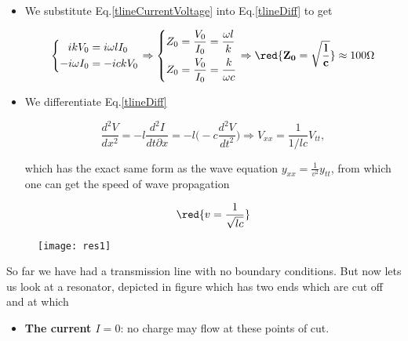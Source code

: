  \begin{itemize}
 \item     We     substitute    Eq.\eqref{tlineCurrentVoltage}     into
   Eq.\eqref{tlineDiff} to get

  \begin{equation}
    \left\lbrace \begin{aligned}
        ikV_0&=i\omega lI_0\\
        -i\omega I_0 & = -ickV_0
      \end{aligned}\right. \Rightarrow\left\lbrace \begin{aligned}
        Z_0&=\frac{V_0}{I_0} = \frac{\omega l }{k}\\
        Z_0&=\frac{V_0}{I_0} = \frac{k}{\omega c}\\
      \end{aligned}\right.  \Rightarrow \red{\mathbf{Z_0 = \sqrt{\frac{l}{c}}}}\approx
    100\Omega
  \end{equation}

\item We differentiate Eq.\eqref{tlineDiff}

  \begin{equation}
    \frac{d^2V}{dx^2} = -l\frac{d^2I}{dt\partial x} = -l\bigg(-c\frac{d^2V}{dt^2}\bigg) \Rightarrow V_{xx} = \frac{1}{1/lc}V_{tt},
  \end{equation}

  \noindent  which  has  the  exact  same form  as  the  wave  equation
  $ y_{xx}=\frac{1}{v^2}y_{tt} $,  from which one can get  the speed of
  wave propagation

  \begin{equation}
    \red{v=\frac{1}{\sqrt{lc}}}
  \end{equation}
\end{itemize}

\begin{figure}
  \caption{\label{tlineres1}}
  \texttt{[image: res1]}
\end{figure}

So far we have had a transmission line with no boundary conditions. But
now lets us look at a resonator,  depicted in figure which has two ends
which are cut off and at which

\begin{itemize}
\item \textbf{The current $ I=0 $}:  no charge may flow at these points
  of cut.
\end{itemize}

